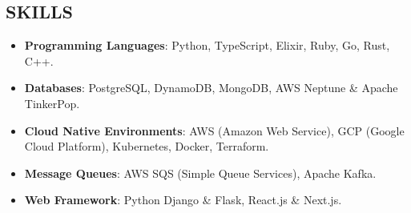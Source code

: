 \subsection*{SKILLS}

\begin{itemize}[leftmargin=*,labelsep=1mm]
  \setlength{\parskip}{0mm}
  \setlength{\itemsep}{1mm}
  \item \textbf{Programming Languages}: Python, TypeScript, Elixir, Ruby, Go, Rust, C++.
  \item \textbf{Databases}: PostgreSQL, DynamoDB, MongoDB, AWS Neptune \& Apache TinkerPop.
  \item \textbf{Cloud Native Environments}: AWS (Amazon Web Service), GCP (Google Cloud Platform), Kubernetes, Docker, Terraform.
  \item \textbf{Message Queues}: AWS SQS (Simple Queue Services), Apache Kafka.
  \item \textbf{Web Framework}: Python Django \& Flask, React.js \& Next.js.
\end{itemize}

